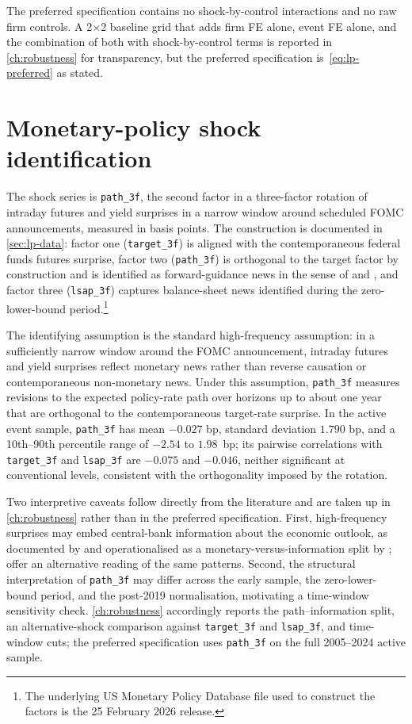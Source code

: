 The preferred specification contains no shock-by-control interactions and no raw firm controls. A 2$\times$2 baseline grid that adds firm FE alone, event FE alone, and the combination of both with shock-by-control terms is reported in \cref{ch:robustness} for transparency, but the preferred specification is~\eqref{eq:lp-preferred} as stated.

\section{Monetary-policy shock identification}
\label{sec:emp-shock}

The shock series is \texttt{path\_3f}, the second factor in a three-factor rotation of intraday futures and yield surprises in a narrow window around scheduled FOMC announcements, measured in basis points. The construction is documented in \cref{sec:lp-data}: factor one (\texttt{target\_3f}) is aligned with the contemporaneous federal funds futures surprise, factor two (\texttt{path\_3f}) is orthogonal to the target factor by construction and is identified as forward-guidance news in the sense of \citet{gurkaynakSackSwanson2005} and \citet{swanson2021}, and factor three (\texttt{lsap\_3f}) captures balance-sheet news identified during the zero-lower-bound period.\footnote{The underlying US Monetary Policy Database file used to construct the factors is the 25 February 2026 release.}

The identifying assumption is the standard high-frequency assumption: in a sufficiently narrow window around the FOMC announcement, intraday futures and yield surprises reflect monetary news rather than reverse causation or contemporaneous non-monetary news. Under this assumption, \texttt{path\_3f} measures revisions to the expected policy-rate path over horizons up to about one year that are orthogonal to the contemporaneous target-rate surprise. In the active event sample, \texttt{path\_3f} has mean $-0.027$ bp, standard deviation $1.790$ bp, and a 10th--90th percentile range of $-2.54$ to $1.98$~bp; its pairwise correlations with \texttt{target\_3f} and \texttt{lsap\_3f} are $-0.075$ and $-0.046$, neither significant at conventional levels, consistent with the orthogonality imposed by the rotation.

Two interpretive caveats follow directly from the literature and are taken up in \cref{ch:robustness} rather than in the preferred specification. First, high-frequency surprises may embed central-bank information about the economic outlook, as documented by \citet{nakamuraSteinsson2018} and operationalised as a monetary-versus-information split by \citet{jarocinskiKaradi2020}; \citet{bauerSwanson2023} offer an alternative reading of the same patterns. Second, the structural interpretation of \texttt{path\_3f} may differ across the early sample, the zero-lower-bound period, and the post-2019 normalisation, motivating a time-window sensitivity check. \cref{ch:robustness} accordingly reports the path--information split, an alternative-shock comparison against \texttt{target\_3f} and \texttt{lsap\_3f}, and time-window cuts; the preferred specification uses \texttt{path\_3f} on the full 2005--2024 active sample.

